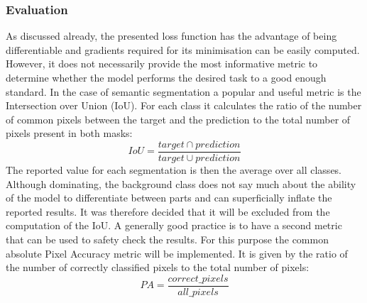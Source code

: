 \documentclass[main.tex]{subfiles}
\begin{document}
\subsubsection{Evaluation}
As discussed already, the presented loss function has the advantage of being differentiable and gradients required for its minimisation can be easily computed. However, it does not necessarily provide the most informative metric to determine whether the model performs the desired task to a good enough standard. In the case of semantic segmentation a popular and useful metric is the Intersection over Union (IoU). For each class it calculates the ratio of the number of common pixels between the target and the prediction to the total number of pixels present in both masks:
\begin{equation}
IoU = \frac{target \cap prediction}{target \cup prediction}
\end{equation}
The reported value for each segmentation is then the average over all classes. Although dominating, the background class does not say much about the ability of the model to differentiate between parts and can superficially inflate the reported results. It was therefore decided that it will be excluded from the computation of the IoU. A generally good practice is to have a second metric that can be used to safety check the results. For this purpose the common absolute Pixel Accuracy metric will be implemented. It is given by the ratio of the number of correctly classified pixels to the total number of pixels:
\begin{equation}
PA = \frac{correct\_pixels}{all\_pixels}
\end{equation}
\end{document}
